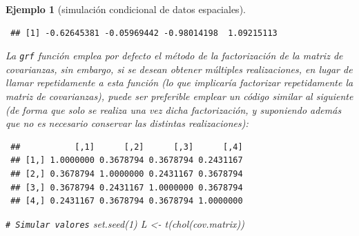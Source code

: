 \documentclass[
]{book}
\newenvironment{Shaded}{\begin{snugshade}}{\end{snugshade}}
\newcommand{\AttributeTok}[1]{\textcolor[rgb]{0.77,0.63,0.00}{#1}}
\newcommand{\CommentTok}[1]{\textcolor[rgb]{0.56,0.35,0.01}{\textit{#1}}}
\newcommand{\DecValTok}[1]{\textcolor[rgb]{0.00,0.00,0.81}{#1}}
\newcommand{\FunctionTok}[1]{\textcolor[rgb]{0.00,0.00,0.00}{#1}}
\newcommand{\NormalTok}[1]{#1}
\newcommand{\OtherTok}[1]{\textcolor[rgb]{0.56,0.35,0.01}{#1}}
\newcommand{\SpecialCharTok}[1]{\textcolor[rgb]{0.00,0.00,0.00}{#1}}
\theoremstyle{break}
\newtheorem{example}{Ejemplo}[chapter]
\theoremstyle{nonumberplain}
\renewcommand{\CommentTok}[1]{\textcolor[rgb]{0.41,0.41,0.41}{\texttt{#1}}}
\begin{document}
\begin{example}[simulación condicional de datos espaciales]
\begin{verbatim}
 ## [1] -0.62645381 -0.05969442 -0.98014198  1.09215113
\end{verbatim}

La \texttt{grf} función emplea por defecto el método de la factorización de la matriz de covarianzas,
sin embargo, si se desean obtener múltiples realizaciones, en lugar de llamar repetidamente a esta función (lo que implicaría factorizar repetidamente la matriz de covarianzas),
puede ser preferible emplear un código similar al siguiente (de forma que solo se realiza una vez dicha factorización, y suponiendo además que no es necesario conservar las distintas realizaciones):

\begin{Shaded}
\end{Shaded}

\begin{verbatim}
 ##           [,1]      [,2]      [,3]      [,4]
 ## [1,] 1.0000000 0.3678794 0.3678794 0.2431167
 ## [2,] 0.3678794 1.0000000 0.2431167 0.3678794
 ## [3,] 0.3678794 0.2431167 1.0000000 0.3678794
 ## [4,] 0.2431167 0.3678794 0.3678794 1.0000000
\end{verbatim}

\begin{Shaded}
\begin{Highlighting}[]
\CommentTok{\# Simular valores}
\FunctionTok{set.seed}\NormalTok{(}\DecValTok{1}\NormalTok{)}
\NormalTok{L }\OtherTok{\textless{}{-}} \FunctionTok{t}\NormalTok{(}\FunctionTok{chol}\NormalTok{(cov.matrix))}


\end{Highlighting}
\end{Shaded}
\end{example}
\end{document}
